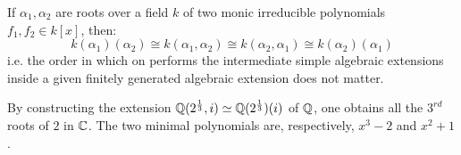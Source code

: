         \begin{remark}
            If $\alpha_1, \alpha_2$ are roots over a field $k$ of two monic irreducible polynomials $f_1, f_2 \in k[x]$, then:
                $$k(\alpha_1)(\alpha_2) \cong k(\alpha_1, \alpha_2) \cong k(\alpha_2, \alpha_1) \cong k(\alpha_2)(\alpha_1)$$
            i.e. the order in which on performs the intermediate simple algebraic extensions inside a given finitely generated algebraic extension does not matter.
        \end{remark}
        \begin{example}
            By constructing the extension $\mathbb{Q}(2^{\frac13}, i) \simeq \mathbb{Q}(2^{\frac13})(i)$ of $\mathbb{Q}$, one obtains all the $3^{rd}$ roots of $2$ in $\mathbb{C}$. The two minimal polynomials are, respectively, $x^3 - 2$ and $x^2 + 1$. 
        \end{example}



